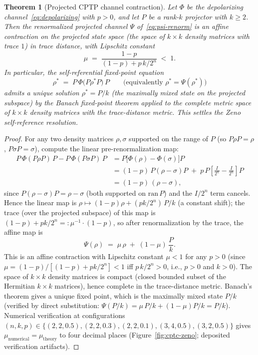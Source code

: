 \documentclass[11pt,a4paper]{article}
\theoremstyle{plain}
\newtheorem{theorem}{Theorem}[section]
\theoremstyle{definition}
\theoremstyle{remark}
\begin{document}
\begin{theorem}[Projected CPTP channel contraction]
\label{thm:zeno-contraction}
Let $\Phi$ be the depolarizing channel~\eqref{eq:depolarizing} with
$p>0$, and let $P$ be a rank-$k$ projector with $k\geq 2$. Then the
renormalized projected channel $\Psi$ of~\eqref{eq:psi-renorm} is an
affine contraction on the projected state space (the space of $k\times
k$ density matrices with trace $1$) in trace distance, with Lipschitz
constant
\begin{equation}\label{eq:mu-theory}
  \mu \;=\; \frac{1-p}{(1-p)+p\,k/2^{n}} \;<\; 1.
\end{equation}
In particular, the self-referential fixed-point equation
\begin{equation}\label{eq:zeno-fixed-eq}
  \rho^{*} \;=\; P\,\Phi\!\bigl(P\rho^{*}P\bigr)\,P
  \qquad\text{(equivalently } \rho^{*}=\Psi(\rho^{*})\text{)}
\end{equation}
admits a unique solution $\rho^{*}=P/k$ (the maximally mixed state on
the projected subspace) by the Banach fixed-point theorem applied to
the complete metric space of $k\times k$ density matrices with the
trace-distance metric. This settles the Zeno self-reference
resolution.
\end{theorem}

\begin{proof}
For any two density matrices $\rho,\sigma$ supported on the range of
$P$ (so $P\rho P=\rho$, $P\sigma P=\sigma$), compute the linear
pre-renormalization map:
\begin{align*}
P\,\Phi(P\rho P)\,P - P\,\Phi(P\sigma P)\,P
&= P\bigl[\Phi(\rho)-\Phi(\sigma)\bigr]P \\
&= (1-p)\,P(\rho-\sigma)P
   \;+\; p\,P\!\left[\tfrac{I}{2^{n}}-\tfrac{I}{2^{n}}\right]\!P \\
&= (1-p)\,(\rho-\sigma),
\end{align*}
since $P(\rho-\sigma)P=\rho-\sigma$ (both supported on $\mathrm{ran}\,P$)
and the $I/2^{n}$ term cancels. Hence the linear map is
$\rho\mapsto (1-p)\rho + (pk/2^{n})\,P/k$ (a constant shift); the
trace (over the projected subspace) of this map is
$(1-p)+pk/2^{n}=:\mu^{-1}\cdot(1-p)$, so after renormalization by
the trace, the affine map is
\begin{equation*}
\Psi(\rho) \;=\; \mu\,\rho \;+\; (1-\mu)\,\frac{P}{k}.
\end{equation*}
This is an affine contraction with Lipschitz constant $\mu<1$ for any
$p>0$ (since $\mu=(1-p)/[(1-p)+pk/2^{n}]<1$ iff $p\,k/2^{n}>0$, i.e.,
$p>0$ and $k>0$). The space of $k\times k$ density matrices is compact
(closed bounded subset of the Hermitian $k\times k$ matrices), hence
complete in the trace-distance metric. Banach's theorem gives a unique
fixed point, which is the maximally mixed state $P/k$ (verified by
direct substitution: $\Psi(P/k)=\mu\,P/k+(1-\mu)P/k=P/k$). Numerical
verification at configurations
$(n,k,p)\in\{(2,2,0.5),(2,2,0.3),(2,2,0.1),(3,4,0.5),(3,2,0.5)\}$
gives $\mu_{\mathrm{numerical}}=\mu_{\mathrm{theory}}$ to four decimal
places (Figure~\ref{fig:cptc-zeno}; deposited verification
artifacts).
\end{proof}
\end{document}
